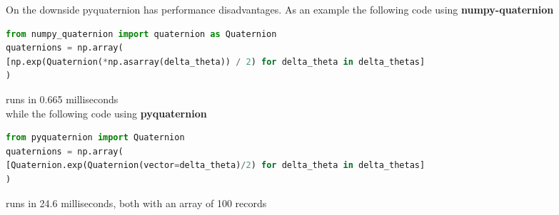 On the downside pyquaternion has performance disadvantages. As an example the following code using \textbf{numpy-quaternion}
\begin{changemargin}{-1cm}{-1cm}
\begin{lstlisting}[language=Python,frame=single]
from numpy_quaternion import quaternion as Quaternion
quaternions = np.array(
[np.exp(Quaternion(*np.asarray(delta_theta)) / 2) for delta_theta in delta_thetas]
)
\end{lstlisting}
\end{changemargin}
runs in 0.665 milliseconds \\
while the following code using \textbf{pyquaternion} 
\begin{changemargin}{-1cm}{-1cm}
\begin{lstlisting}[language=Python,frame=single]
from pyquaternion import Quaternion
quaternions = np.array(
[Quaternion.exp(Quaternion(vector=delta_theta)/2) for delta_theta in delta_thetas]
)
\end{lstlisting}
\end{changemargin}
runs in 24.6 milliseconds, both with an array of 100 records